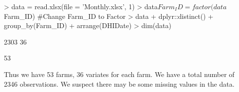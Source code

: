 \documentclass[12pt,]{article}
\begin{document}
\begin{Schunk}
\begin{Sinput}
> data = read.xlsx(file = 'Monthly.xlsx', 1)
> data$Farm_ID = factor(data$Farm_ID)  #Change Farm_ID to Factor
> data %<>%
+   dplyr::distinct() %>%
+   group_by(Farm_ID) %>%
+   arrange(DHIDate)
> dim(data)
\end{Sinput}
\begin{Soutput}
[1] 2303   36
\end{Soutput}
\begin{Soutput}
[1] 53
\end{Soutput}
\end{Schunk}
Thus we have 53 farms, 36 variates for each farm. We have a total number of 2346 observations. We suspect there may be some missing values in the data.
\end{document}
